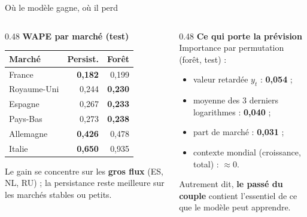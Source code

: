 \documentclass[aspectratio=169,10pt]{beamer}
\begin{document}
\begin{frame}{Où le modèle gagne, où il perd}
  \begin{columns}[T,onlytextwidth]
    \begin{column}{0.48\textwidth}
      \textbf{WAPE par marché (test)}
      \begin{tabular}{lrr}
        \toprule
        Marché & Persist. & Forêt \\
        \midrule
        France & \textbf{0,182} & 0,199 \\
        Royaume-Uni & 0,244 & \textbf{0,230} \\
        Espagne & 0,267 & \textbf{0,233} \\
        Pays-Bas & 0,273 & \textbf{0,238} \\
        Allemagne & \textbf{0,426} & 0,478 \\
        Italie & \textbf{0,650} & 0,935 \\
        \bottomrule
      \end{tabular}
      \vspace{0.4em}

      \small Le gain se concentre sur les \textbf{gros flux} (ES, NL, RU) ;
      la persistance reste meilleure sur les marchés stables ou petits.
    \end{column}
    \begin{column}{0.48\textwidth}
      \textbf{Ce qui porte la prévision}\\
      \small Importance par permutation (forêt, test) :
      \begin{itemize}
        \item valeur retardée $y_t$ : \textbf{0,054} ;
        \item moyenne des 3 derniers logarithmes : \textbf{0,040} ;
        \item part de marché : \textbf{0,031} ;
        \item contexte mondial (croissance, total) : \textbf{$\approx 0$}.
      \end{itemize}
      \vspace{0.3em}
      \small Autrement dit, \textbf{le passé du couple} contient l'essentiel
      de ce que le modèle peut apprendre.
    \end{column}
  \end{columns}
\end{frame}
\end{document}
